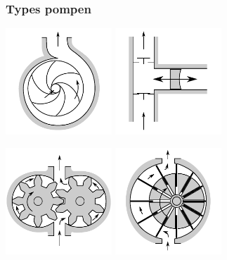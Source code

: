 \documentclass[t]{beamer}
\begin{document}
  	\begin{frame}
  		\frametitle{Types pompen}
  		\center
  		\includegraphics[width=0.3\textwidth]{fig/leidingstelsels/Centrifugaalpomp}
  		\hspace{2cm}
  		\includegraphics[width=0.3\textwidth]{fig/leidingstelsels/Zuigerpomp}
  		
  		\vspace{0.5cm}
  		\includegraphics[width=0.3\textwidth]{fig/leidingstelsels/Tandradpomp}
  		\hspace{2cm}
  		\includegraphics[width=0.3\textwidth]{fig/leidingstelsels/Schottenpomp}
    \end{frame} 
\end{document}
